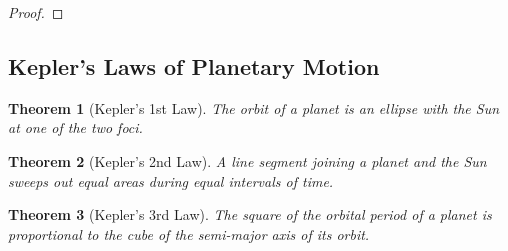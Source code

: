 \documentclass[letterpaper, 12pt]{amsart}
\newtheorem{thm}{Theorem}[section]					%
\theoremstyle{definition}  							%
\begin{document}
			\begin{proof}
			\end{proof}

		\subsection{Kepler's Laws of Planetary Motion}
		\label{sub:kepler_s_laws_of_planetary_motion}
			\begin{thm}[Kepler's 1st Law]
			The orbit of a planet is an ellipse with the Sun at one of the two foci.
			\end{thm}

			\begin{thm}[Kepler's 2nd Law]
			A line segment joining a planet and the Sun sweeps out equal areas during equal intervals of time.
			\end{thm}

			\begin{thm}[Kepler's 3rd Law]
			The square of the orbital period of a planet is proportional to the cube of the semi-major axis of its orbit.
			\end{thm}
\end{document}
